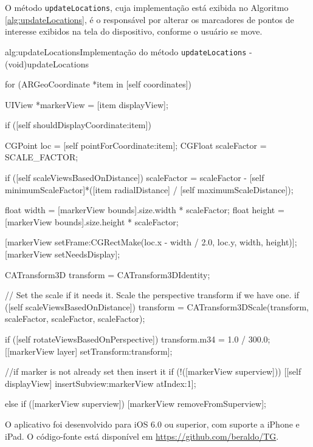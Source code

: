 O método \texttt{updateLocations}, cuja implementação está exibida no Algoritmo
\ref{alg:updateLocations}, é o responsável por alterar os marcadores de pontos de
interesse exibidos na tela do dispositivo, conforme o usuário se move.

\begin{sourcecode}{alg:updateLocations}{Implementação do método \texttt{updateLocations}}
- (void)updateLocations
{
	for (ARGeoCoordinate *item in [self coordinates]) {

        UIView *markerView = [item displayView];

		if ([self shouldDisplayCoordinate:item]) {

            CGPoint loc = [self pointForCoordinate:item];
            CGFloat scaleFactor = SCALE_FACTOR;

			if ([self scaleViewsBasedOnDistance]) 
				scaleFactor = scaleFactor - [self minimumScaleFactor]*([item radialDistance] / [self maximumScaleDistance]);

			float width	 = [markerView bounds].size.width  * scaleFactor;
			float height = [markerView bounds].size.height * scaleFactor;

			[markerView setFrame:CGRectMake(loc.x - width / 2.0, loc.y, width, height)];
            [markerView setNeedsDisplay];

			CATransform3D transform = CATransform3DIdentity;

			// Set the scale if it needs it. Scale the perspective transform if we have one.
			if ([self scaleViewsBasedOnDistance]) 
				transform = CATransform3DScale(transform, scaleFactor, scaleFactor, scaleFactor);

			if ([self rotateViewsBasedOnPerspective]) {
				transform.m34 = 1.0 / 300.0;
			}
			[[markerView layer] setTransform:transform];

			//if marker is not already set then insert it
			if (!([markerView superview])) {
				[[self displayView] insertSubview:markerView atIndex:1];
			}
		} 
		else 
            if ([markerView superview])
                [markerView removeFromSuperview];

	}
}
\end{sourcecode}


O aplicativo foi desenvolvido para iOS 6.0 ou superior, com suporte a iPhone e iPad. O 
código-fonte está disponível em \href{https://github.com/beraldo/TG}{https://github.com/beraldo/TG}.





